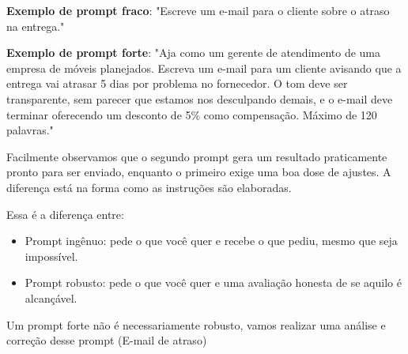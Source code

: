 \documentclass[11pt, a4paper]{article}
\begin{document}
\textbf{Exemplo de prompt fraco}: "Escreve um e-mail para o cliente sobre o atraso na entrega." 

\textbf{Exemplo de prompt forte}: "Aja como um gerente de atendimento de uma empresa de móveis planejados. Escreva um e-mail para um cliente avisando que a entrega vai atrasar 5 dias por problema no fornecedor. O tom deve ser transparente, sem parecer que estamos nos desculpando demais, e o e-mail deve terminar oferecendo um desconto de 5\% como compensação. Máximo de 120 palavras." 

Facilmente observamos que o segundo prompt gera um resultado praticamente pronto para ser enviado, enquanto o primeiro exige uma boa dose de ajustes. A diferença está na forma como as instruções são elaboradas.

Essa é a diferença entre:
\begin{itemize}
	\item Prompt ingênuo: pede o que você quer e recebe o que pediu, mesmo que seja impossível.
	\item Prompt robusto: pede o que você quer e uma avaliação honesta de se aquilo é alcançável.
\end{itemize}

Um prompt forte não é necessariamente robusto, vamos realizar uma análise e correção desse prompt (E-mail de atraso)
\end{document}
